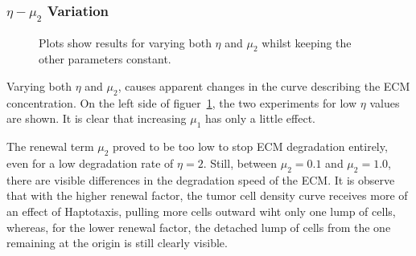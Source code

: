 \subsubsection*{$\eta -\mu_2$ Variation}
\begin{figure}[h!]
    \centering
    \caption{Plots show results for varying both $\eta$ and $\mu_2$ whilst keeping the other parameters constant.}
    \label{fig:prolif_eta_mu_2_variation}
\end{figure}

Varying both $\eta$ and $\mu_2$, causes apparent changes in the curve describing the ECM concentration. On the left side of figuer~\ref{fig:prolif_eta_mu_2_variation}, the two experiments for low $\eta$ values are shown. It is clear that increasing $\mu_1$ has only a little effect. 

The renewal term $\mu_2$ proved to be too low to stop ECM degradation entirely, even for a low degradation rate of $\eta=2$. Still, between $\mu_2=0.1$ and $\mu_2=1.0$, there are visible differences in the degradation speed of the ECM. It is observe that with the higher renewal factor, the tumor cell density curve receives more of an effect of Haptotaxis, pulling more cells outward wiht only one lump of cells, whereas, for the lower renewal factor, the detached lump of cells from the one remaining at the origin is still clearly visible. 

